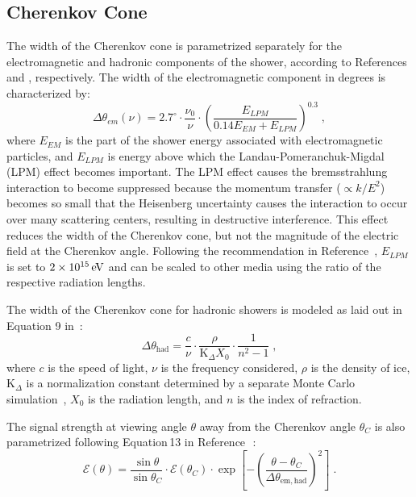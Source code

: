 
\subsection{Cherenkov Cone}
\label{subsec:cherenkov_width}
The width of the Cherenkov cone is parametrized separately for the electromagnetic and hadronic components of the shower, according to References \cite{JaimeAskarian2000} and \cite{jaime05}, respectively.
The width of the electromagnetic
component in degrees is characterized by:
\begin{equation}
\label{eq:deltheta_em}
\Delta\theta_{em}(\nu)=2.7^{\circ} \cdot \frac{\nu_0}{\nu}\cdot \left(
  \frac{E_{LPM}}{ 0.14 E_{EM}+E_{LPM}} \right)^{0.3} \;,
\end{equation}
where 
$E_{EM}$ is the part of the shower energy associated with electromagnetic particles, and 
$E_{LPM}$ is energy above which the Landau-Pomeranchuk-Migdal
(LPM) effect becomes important.  
The LPM effect causes
the bremsstrahlung interaction to become suppressed because
the momentum transfer ($\propto k/E^2$) becomes so small 
that the Heisenberg uncertainty
causes the interaction to occur over many
scattering centers, resulting in destructive interference.  
This effect reduces the width of the Cherenkov cone, but not the magnitude of the electric field at the Cherenkov angle.
Following the recommendation in Reference~\cite{JaimeAskarian2000}, 
$E_{LPM}$ is set to $2\times10^{15}\mathrm{\,e\kern -0.1em V}$
and can be scaled to other media using the ratio of the respective radiation lengths.


The width of the Cherenkov cone for hadronic showers is modeled as laid out in Equation 9
in~\cite{jaime05}:
\begin{equation}
\Delta \theta_{\mathrm{had}}=\frac{c}{\nu} \cdot
	\frac{\rho}{\mathrm{K}_{\Delta} X_0} \cdot
	\frac{1}{n^2-1} \;,
\end{equation}
\noindent where
$c$ is the speed of light,
$\nu$ is the frequency considered, 
$\rho$ is the density of ice,
$\mathrm{K}_{\Delta}$ is a normalization constant determined by a
separate Monte Carlo simulation~\cite{jaime05},
$X_0$ is the radiation length, and
$n$ is the index of refraction.

The signal strength at viewing angle $\theta$ 
away from the Cherenkov angle $\theta_C$ is also parametrized following
Equation\,13 in Reference\,~\cite{jaime05}:
\begin{equation}
\mathcal{E}(\theta)=\frac{\sin{\theta}}{\sin{\theta_C}} \cdot
\mathcal{E}(\theta_C)\cdot \exp\left[-\left(
    \frac{\theta-\theta_C}{\Delta\theta_{\mathrm{em,had}}} \right)^2
\right] \;.
\end{equation}




